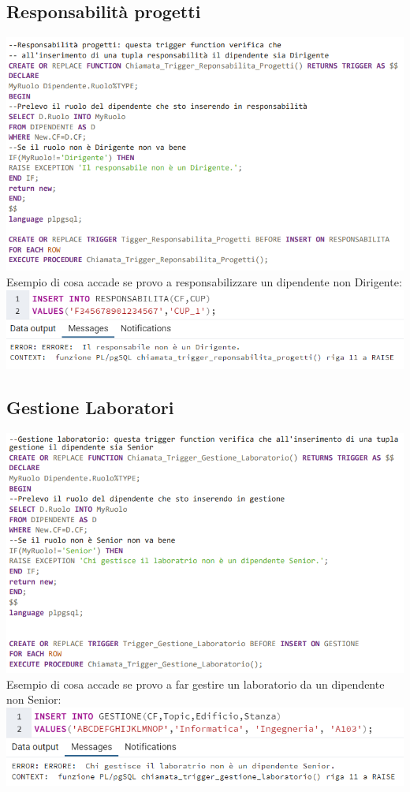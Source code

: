 \subsection{Responsabilità progetti}
\includegraphics[width=1\textwidth]{Immagini/responsabilita.sql}
\newline\newline
Esempio di cosa accade se provo a responsabilizzare un dipendente non Dirigente:
\newline\newline
\includegraphics[width=1\textwidth]{Immagini/reses}
\subsection{Gestione Laboratori}
\includegraphics[width=1\textwidth]{Immagini/gestione.sql}
\newline\newline
Esempio di cosa accade se provo a far gestire un laboratorio da un dipendente non Senior:
\newline\newline
\includegraphics[width=1\textwidth]{Immagini/geses}
